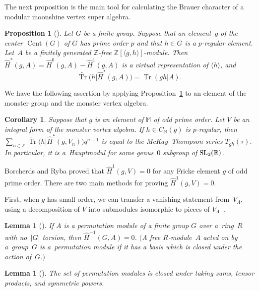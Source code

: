 \documentclass[pdftex]{sigma}%
\numberwithin{equation}{section}
\newtheorem{Corollary}[Theorem]{Corollary}
\newtheorem{Lemma}[Theorem]{Lemma}
\newtheorem{Proposition}[Theorem]{Proposition}
 { \theoremstyle{definition}
\newtheorem{Definition}[Theorem]{Definition}
\newtheorem{Note}[Theorem]{Note}
\newtheorem{Example}[Theorem]{Example}
\newtheorem{Remark}[Theorem]{Remark} }
\begin{document}
The next proposition is the main tool for calculating the Brauer character of a modular moonshine vertex super algebra.

\begin{Proposition}[{\cite[Proposition 2.2]{BR}}]\label{prop2.2}
Let $G$ be a finite group. Suppose that an element~$g$ of the center $\operatorname{Cent}(G)$ of $G$ has prime order $p$ and that $h \in G$ is a $p$-regular element. Let~$A$ be a finitely generated $\mathbb{Z}$-free $\mathbb{Z}[\langle g,h \rangle]$-module. Then $\hat{H}^*(g,A)=\hat{H}^0(g,A)-\hat{H}^1(g,A)$ is a virtual representation of $\langle h \rangle$, and
\[
\widetilde{\operatorname{Tr}}\big(h|\hat{H}^*(g,A)\big)=\operatorname{Tr}(gh|A) .
\]
\end{Proposition}

We have the following assertion by applying Proposition~\ref{prop2.2} to an element of the monster group and the monster vertex algebra.

\begin{Corollary}
Suppose that $g$ is an element of $\mathbb{M}$ of odd prime order. Let $V$ be an integral form of the monster vertex algebra. If $h\in C_{\mathbb{M}}(g)$ is $p$-regular, then $\sum_{n\in \mathbb{Z}}\widetilde{\operatorname{Tr}}\big(h|\hat{H}^*(g,V_n)\big)q^{n-1}$ is equal to the McKay--Thompson series $T_{gh}(\tau)$. In particular, it is a~Hauptmodul for some genus~$0$ subgroup of ${\rm SL}_2(\mathbb{R})$.
\end{Corollary}

Borcherds and Ryba proved that ${\hat{H}}^1(g,V)=0$ for any Fricke element $g$ of odd prime order. There are two main methods for proving ${\hat{H}}^1(g,V)=0$.

First, when $g$ has small order, we can transfer a vanishing statement from~$V_\Lambda$, using a decomposition of $V$ into submodules isomorphic to pieces of $V_\Lambda$~\cite{BR}.

\begin{Lemma}[{\cite[Lemma 4.1]{BR}}] \label{par}
If $A$ is a permutation module of a finite group $G$ over a~ring~$R$ with no~$|G|$ torsion, then $\hat{H}^{-1}(G,A)=0$.
$($A free $R$-module~$A$ acted on by a~group~$G$ is a~permutation module if it has a basis which is closed under the action of~$G$.$)$
\end{Lemma}

\begin{Lemma}[{\cite[Lemma 4.2]{BR}}]\label{closedpar}
The set of permutation modules is closed under taking sums, tensor products, and symmetric powers.
\end{Lemma}
\end{document}
